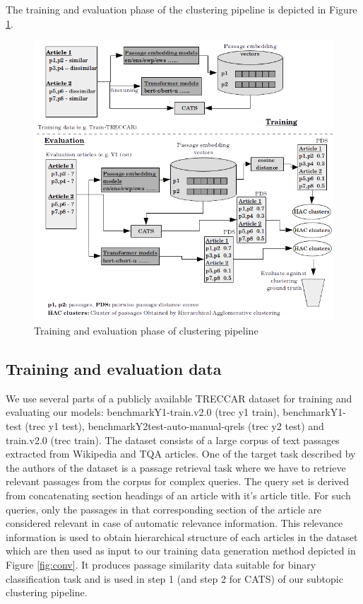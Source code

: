 \documentclass[sigconf,authordraft]{acmart}
\begin{document}
The training and evaluation phase of the clustering pipeline is depicted in Figure \ref{fig:pipe}.
\begin{figure}[h]
  \centering
  \includegraphics[width=\linewidth]{graphics/pipeline2.png}
  \caption{Training and evaluation phase of clustering pipeline}
  \label{fig:pipe}
\end{figure}

\subsection{Training and evaluation data} We use several parts of a publicly available TRECCAR dataset for training and evaluating our models: benchmarkY1-train.v2.0 (trec y1 train), benchmarkY1-test (trec y1 test), benchmarkY2test-auto-manual-qrels (trec y2 test) and train.v2.0 (trec train). The dataset consists of a large corpus of text passages extracted from Wikipedia and TQA articles. One of the target task described by the authors of the dataset is a passage retrieval task where we have to retrieve relevant passages from the corpus for complex queries. The query set is derived from concatenating section headings of an article with it's article title. For such queries, only the passages in that corresponding section of the article are considered relevant in case of automatic relevance information. This relevance information is used to obtain hierarchical structure of each articles in the dataset which are then used as input to our training data generation method depicted in Figure \ref{fig:conv}. It produces passage similarity data suitable for binary classification task and is used in step 1 (and step 2 for CATS) of our subtopic clustering pipeline.
\end{document}
